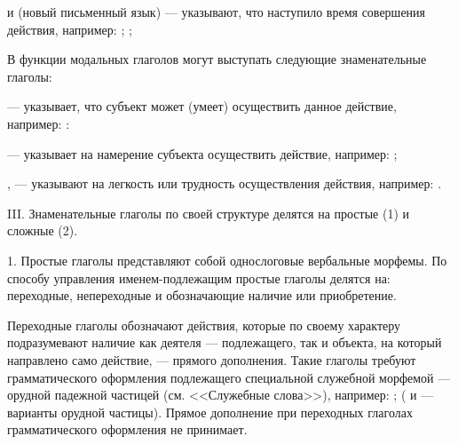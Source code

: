  и  (новый письменный язык) --- указывают, что наступило время совершения действия, например:
;
;

В функции модальных глаголов могут выступать следующие знаменательные глаголы:

 --- указывает, что субъект может (умеет) осуществить данное действие, например: :

 --- указывает на намерение субъекта осуществить действие, например: ;

,  --- указывают на легкость или трудность осуществления действия, например: .

III. Знаменательные глаголы по своей структуре делятся на простые (1) и сложные (2).

1. Простые глаголы представляют собой однослоговые вербальные морфемы. По способу управления именем-подлежащим простые глаголы делятся на: переходные, непереходные и обозначающие наличие или приобретение.

Переходные глаголы обозначают действия, которые по своему характеру подразумевают наличие как деятеля --- подлежащего, так и объекта, на который направлено само действие, --- прямого дополнения. Такие глаголы требуют грамматического оформления подлежащего специальной служебной морфемой --- орудной падежной частицей (см. <<Служебные слова>>), например:
;
( и  --- варианты орудной частицы). Прямое дополнение при переходных глаголах грамматического оформления не принимает.

